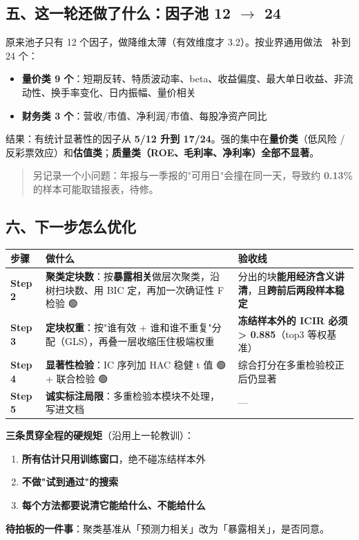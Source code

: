 \documentclass[11pt]{article}
\begin{document}
\subsection{\texorpdfstring{五、这一轮还做了什么：因子池 12 \ensuremath{\rightarrow} 24}{五、这一轮还做了什么：因子池 12 → 24}}
原来池子只有 12 个因子，做降维太薄（有效维度才 3.2）。按业界通用做法 🔴 补到 24 个：
\begin{itemize}
  \item \textbf{量价类 9 个}：短期反转、特质波动率、beta、收益偏度、最大单日收益、非流动性、换手率变化、日内振幅、量价相关
  \item \textbf{财务类 3 个}：营收/市值、净利润/市值、每股净资产同比
\end{itemize}
结果：有统计显著性的因子从 \textbf{5/12 升到 17/24}。强的集中在\textbf{量价类}（低风险 / 反彩票效应）和\textbf{估值类}；\textbf{质量类（ROE、毛利率、净利率）全部不显著}。
\begin{quote}
另记录一个小问题：年报与一季报的"可用日"会撞在同一天，导致约 \textbf{0.13\%} 的样本可能取错报表，待修。
\end{quote}
\subsection{\texorpdfstring{六、下一步怎么优化}{六、下一步怎么优化}}
{\small
\begin{longtable}{p{1.28cm}p{9.29cm}p{5.63cm}}
\toprule
步骤 & 做什么 & 验收线 \\
\midrule
\textbf{Step 2} & \textbf{聚类定块数}：按\textbf{暴露相关}做层次聚类，沿树扫块数、用 BIC 定，再加一次确证性 F 检验 🟢 & 分出的块\textbf{能用经济含义讲清}，且\textbf{跨前后两段样本稳定} \\
\textbf{Step 3} & \textbf{定块权重}：按"谁有效 + 谁和谁不重复"分配（GLS），再叠一层收缩压住极端权重 & \textbf{冻结样本外的 ICIR 必须 > 0.885}（top3 等权基准） \\
\textbf{Step 4} & \textbf{显著性检验}：IC 序列加 HAC 稳健 t 值 🟢 + 联合检验 🟢 & 综合打分在多重检验校正后仍显著 \\
\textbf{Step 5} & \textbf{诚实标注局限}：多重检验本模块不处理，写进文档 🔴 & --- \\
\bottomrule
\end{longtable}
}
\textbf{三条贯穿全程的硬规矩}（沿用上一轮教训）：
\begin{enumerate}
  \item \textbf{所有估计只用训练窗口}，绝不碰冻结样本外
  \item \textbf{不做"试到通过"的搜索}
  \item \textbf{每个方法都要说清它能给什么、不能给什么}
\end{enumerate}
\textbf{待拍板的一件事}：聚类基准从「预测力相关」改为「暴露相关」，是否同意。
\end{document}
